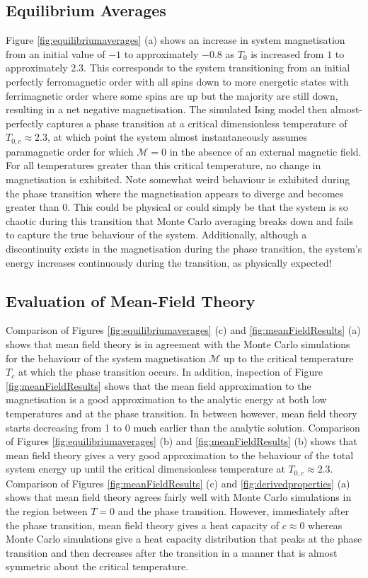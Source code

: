 \documentclass[11pt]{iopart}
\begin{document}
\subsection{Equilibrium Averages}
Figure \ref{fig:equilibriumaverages} (a) shows an increase in system magnetisation from an initial value of $-1$ to approximately $-0.8$ as $T_0$ is increased from $1$ to approximately 2.3. This corresponds to the system transitioning from an initial perfectly ferromagnetic order with all spins down to more energetic states with ferrimagnetic order where some spins are up but the majority are still down, resulting in a net negative magnetisation. The simulated Ising model then almost-perfectly captures a phase transition at a critical dimensionless temperature of $T_{0,c} \approx 2.3$, at which point the system almost instantaneously assumes paramagnetic order for which $\mathcal{M} = 0$ in the absence of an external magnetic field. For all temperatures greater than this critical temperature, no change in magnetisation is exhibited. Note somewhat weird behaviour is exhibited during the phase transition where the magnetisation appears to diverge and becomes greater than 0. This could be physical or could simply be that the system is so chaotic during this transition that Monte Carlo averaging breaks down and fails to capture the true behaviour of the system. Additionally, although a discontinuity exists in the magnetisation during the phase transition, the system's energy increases continuously during the transition, as physically expected!

\subsection{Evaluation of Mean-Field Theory}
Comparison of Figures \ref{fig:equilibriumaverages} (c) and \ref{fig:meanFieldResults} (a) shows that mean field theory is in agreement with the Monte Carlo simulations for the behaviour of the system magnetisation $\mathcal{M}$ up to the critical temperature $T_c$ at which the phase transition occurs. In addition, inspection of Figure \ref{fig:meanFieldResults} shows that the mean field approximation to the magnetisation is a good approximation to the analytic energy at both low temperatures and at the phase transition. In between however, mean field theory starts decreasing from 1 to 0 much earlier than the analytic solution. Comparison of Figures \ref{fig:equilibriumaverages} (b) and \ref{fig:meanFieldResults} (b) shows that mean field theory gives a very good approximation to the behaviour of the total system energy up until the critical dimensionless temperature at $T_{0,c} \approx 2.3$. Comparison of Figures \ref{fig:meanFieldResults} (c) and \ref{fig:derivedproperties} (a) shows that mean field theory agrees fairly well with Monte Carlo simulations in the region between $T = 0$ and the phase transition. However, immediately after the phase transition, mean field theory gives a heat capacity of $c \approx 0$ whereas Monte Carlo simulations give a heat capacity distribution that peaks at the phase transition and then decreases after the transition in a manner that is almost symmetric about the critical temperature.
\end{document}
